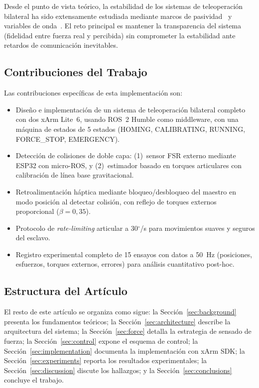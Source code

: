 \documentclass[journal,10pt,twoside]{IEEEtran}
\begin{document}
Desde el punto de vista teórico, la estabilidad de los sistemas de
teleoperación bilateral ha sido extensamente estudiada mediante marcos
de pasividad~\cite{colgate1993} y variables de onda~\cite{niemeyer2008}.
El reto principal es mantener la transparencia del sistema (fidelidad
entre fuerza real y percibida) sin comprometer la estabilidad ante
retardos de comunicación inevitables.

\subsection{Contribuciones del Trabajo}

Las contribuciones específicas de esta implementación son:

\begin{itemize}[itemsep=0.3em]
  \item Diseño e implementación de un sistema de teleoperación bilateral
        completo con dos xArm Lite~6, usando ROS~2 Humble como middleware,
        con una máquina de estados de 5 estados
        (HOMING, CALIBRATING, RUNNING, FORCE\_STOP, EMERGENCY).
  \item Detección de colisiones de doble capa: (1)~sensor FSR externo
        mediante ESP32 con micro-ROS, y (2)~estimador basado en torques
        articulares con calibración de línea base gravitacional.
  \item Retroalimentación háptica mediante bloqueo/desbloqueo del
        maestro en modo posición al detectar colisión, con reflejo
        de torques externos proporcional ($\beta=0{,}35$).
  \item Protocolo de \emph{rate-limiting} articular a 30$^\circ$/s
        para movimientos suaves y seguros del esclavo.
  \item Registro experimental completo de 15 ensayos con datos a
        50~Hz (posiciones, esfuerzos, torques externos, errores)
        para análisis cuantitativo post-hoc.
\end{itemize}

\subsection{Estructura del Artículo}
El resto de este artículo se organiza como sigue:
la Sección~\ref{sec:background} presenta los fundamentos teóricos;
la Sección~\ref{sec:architecture} describe la arquitectura del sistema;
la Sección~\ref{sec:force} detalla la estrategia de sensado de fuerza;
la Sección~\ref{sec:control} expone el esquema de control;
la Sección~\ref{sec:implementation} documenta la implementación con xArm SDK;
la Sección~\ref{sec:experiments} reporta los resultados experimentales;
la Sección~\ref{sec:discussion} discute los hallazgos;
y la Sección~\ref{sec:conclusions} concluye el trabajo.
\end{document}
